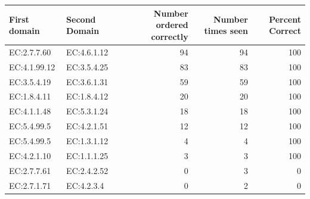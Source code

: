 \DIFdelend \DIFaddbegin \subsection*{}
\DIFaddend \begin{table}[htbp]
  \begin{tabular}{|l|l|r|r|r|}
  \hline
  First domain & Second Domain & Number ordered correctly & Number times seen & Percent Correct \\
  \hline
  EC:2.7.7.60  & EC:4.6.1.12   & 94                                           & 94                                       & 100                                 \\
  \hline
  EC:4.1.99.12 & EC:3.5.4.25   & 83                                           & 83                                       & 100                                 \\
  \hline
  EC:3.5.4.19  & EC:3.6.1.31   & 59                                           & 59                                       & 100                                 \\
  \hline
  EC:1.8.4.11  & EC:1.8.4.12   & 20                                           & 20                                       & 100                                 \\
  \hline
  EC:4.1.1.48  & EC:5.3.1.24   & 18                                           & 18                                       & 100                                 \\
  \hline
  EC:5.4.99.5  & EC:4.2.1.51   & 12                                           & 12                                       & 100                                 \\
  \hline
  EC:5.4.99.5  & EC:1.3.1.12   & 4                                            & 4                                        & 100                                 \\
  \hline
  EC:4.2.1.10  & EC:1.1.1.25   & 3                                            & 3                                        & 100                                 \\
  \hline
  EC:2.7.7.61  & EC:2.4.2.52   & 0                                            & 3                                        & 0                                   \\
  \hline
  EC:2.7.1.71  & EC:4.2.3.4    & 0                                            & 2                                        & 0                                   \\

\end{tabular}
\end{table}
